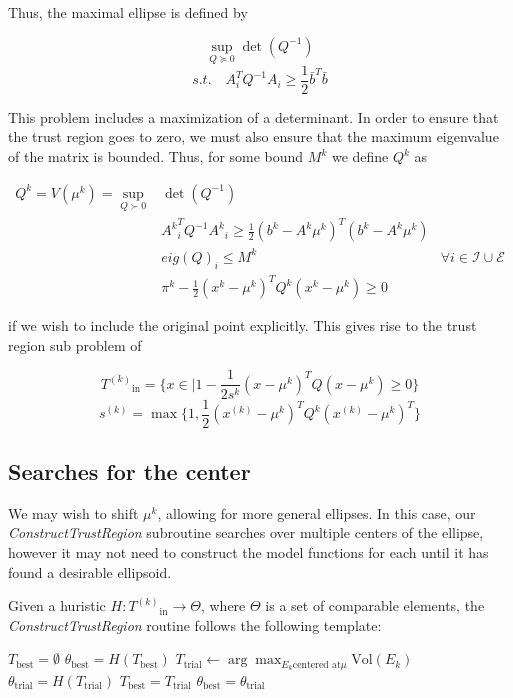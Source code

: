 \documentclass{article}
\theoremstyle{case}
\newcommand{\iteratek}{{x}^{(k)}}
\newcommand{\trialk}{{s}^{(k)}}
\newcommand{\innertrk}{{T^{(k)}}_{\text{in}}}
\begin{document}
Thus, the maximal ellipse is defined by

\[
\sup_{Q \succeq 0} \det(Q^{-1})
\]
\[
s.t. \quad A_i^T Q^{-1} A_i \ge \frac 1 2 \bar{b}^T\bar{b}
\]


This problem includes a maximization of a determinant.
In order to ensure that the trust region goes to zero, we must also ensure that the maximum eigenvalue of the matrix is bounded.
Thus, for some bound $M^k$ we define $Q^k$ as

\begin{center}
\begin{align}
\label{ellipse_1}
Q^k = V(\mu^k) = \sup_{Q \succ 0} & \det(Q^{-1}) & \\
  & {A^k}_i^T Q^{-1} {A^k}_i \ge \frac 1 2 (b^k - A^k\mu^{k})^T(b^k - A^k \mu^{k}) & \\
  & eig(Q)_i \le M^k & \forall i \in \mathcal I \cup \mathcal E \\
  & \pi^k - \frac 1 2 (x^k - \mu^{k})^TQ^{k}(x^k - \mu^{k}) \ge 0
\end{align}
\end{center}

if we wish to include the original point explicitly.
This gives rise to the trust region sub problem of

$$\innertrk = \{x \in \mathbb | 1 - \frac 1 {2s^k} (x - \mu^{k})^T Q (x - \mu^{k}) \ge 0\} $$
$$\trialk = \max \{1, \frac 1 {2} (\iteratek - \mu^{k})^T Q^k (\iteratek - \mu^{k})^T \}$$


\subsection{Searches for the center}

We may wish to shift $\mu^k$, allowing for more general ellipses.
In this case, our \emph{ConstructTrustRegion} subroutine searches over multiple centers of the ellipse, however it may not need to construct the model functions for each until it has found a desirable ellipsoid.

Given a huristic $H : \innertrk \to \Theta$, where $\Theta$ is a set of comparable elements, the \emph{ConstructTrustRegion} routine follows the following template:

\begin{algorithmic}
    \State $T_{\text{best}} = \emptyset$
    \State $\theta_{\text{best}} = H(T_{\text{best}})$
        \State $T_{\text{trial}} \gets \arg\max_{E_k \text{centered at} \mu} \text{Vol}(E_k)$
        \State $\theta_{\text{trial}} = H(T_{\text{trial}})$
            \State $T_{\text{best}} = T_{\text{trial}}$
            \State $\theta_{\text{best}} = \theta_{\text{trial}}$
        \EndIf{}
    \EndFor
\EndProcedure
\end{algorithmic}
\end{document}
